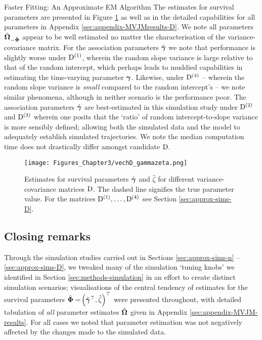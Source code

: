 \begin{chapter}{\label{cha:approx}Faster Fitting: An Approximate EM Algorithm}
  The estimates for survival parameters are presented in Figure \ref{fig:approx-sims-D} as well as in the detailed capabilities for all parameters in Appendix \ref{sec:appendix-MVJMresults-D}. We note all parameters $\hat{\bm{\Omega}}_{-\hat{\bm{\Phi}}}$ appear to be well estimated no matter the characterisation of the variance-covariance matrix. For the association parameters $\hat{\bm{\gamma}}$ we note that performance is slightly worse under $\mathrm{D}^{(1)}$, wherein the random slope variance is large relative to that of the random intercept, which perhaps leads to muddied capabilities in estimating the time-varying parameter $\bm{\gamma}$. Likewise, under $\mathrm{D}^{(4)}$ -- wherein the random slope variance is \textit{small} compared to the random intercept's -- we note similar phenomena, although in neither scenario is the performance poor. The association parameters $\hat{\bm{\gamma}}$ are best-estimated in this simulation study under $\mathrm{D}^{(2)}$ and $\mathrm{D}^{(3)}$ wherein one posits that the `ratio' of random intercept-to-slope variance is more sensibly defined; allowing both the simulated data and the model to adequately establish simulated trajectories. We note the median computation time does not drastically differ amongst candidate $\mathrm{D}$.

  \begin{figure}[t]
      \centering
      \texttt{[image: Figures\_Chapter3/vechD\_gammazeta.png]}
      \caption{Estimates for survival parameters $\hat{\bm{\gamma}}$ and $\hat{\zeta}$ for different variance-covariance matrices $\mathrm{D}$. The dashed line signifies the true parameter value. For the matrices $\mathrm{D}^{(1)},\dots,\mathrm{D}^{(4)}$ see Section \ref{sec:approx-sims-D}.}
      \label{fig:approx-sims-D}
  \end{figure}

  \subsection{Closing remarks}\label{sec:approx-simstudy-conclusion}
  Through the simulation studies carried out in Sections \ref{sec:approx-sims-n} -- \ref{sec:approx-sims-D}, we tweaked many of the simulation `tuning knobs' we identified in Section \ref{sec:methods-simulation} in an effort to create distinct simulation scenarios; visualisations of the central tendency of estimates for the survival parameters $\hat{\bm{\Phi}}=\!\left(\hat{\bm{\gamma}}^\top,\hat{\zeta}\right)^\top$ were presented throughout, with detailed tabulation of \textit{all} parameter estimates $\hat{\bm{\Omega}}$ given in Appendix \ref{sec:appendix-MVJM-results}. For all cases we noted that parameter estimation was not negatively affected by the changes made to the simulated data.
  

\end{chapter}
